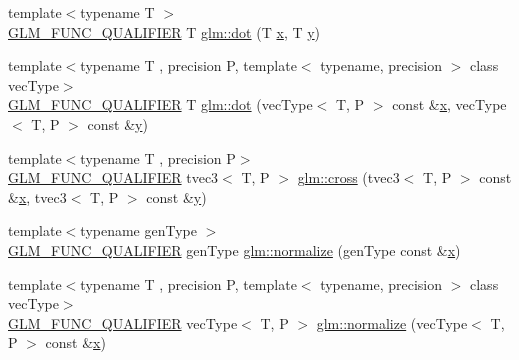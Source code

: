 \begin{DoxyCompactItemize}
{\footnotesize template$<$typename T $>$ }\\\mbox{\hyperlink{setup_8hpp_a33fdea6f91c5f834105f7415e2a64407}{G\+L\+M\+\_\+\+F\+U\+N\+C\+\_\+\+Q\+U\+A\+L\+I\+F\+I\+ER}} T \mbox{\hyperlink{namespaceglm_a40370edb74dec9048258c063b9c091c9}{glm\+::dot}} (T \mbox{\hyperlink{glad_8h_a92d0386e5c19fb81ea88c9f99644ab1d}{x}}, T \mbox{\hyperlink{glad_8h_a66ddd433d2cacfe27f5906b7e86faeed}{y}})
\item 
{\footnotesize template$<$typename T , precision P, template$<$ typename, precision $>$ class vec\+Type$>$ }\\\mbox{\hyperlink{setup_8hpp_a33fdea6f91c5f834105f7415e2a64407}{G\+L\+M\+\_\+\+F\+U\+N\+C\+\_\+\+Q\+U\+A\+L\+I\+F\+I\+ER}} T \mbox{\hyperlink{group__core__func__geometric_ga7dada304da2ba7dd3376ab4f178c3f6b}{glm\+::dot}} (vec\+Type$<$ T, P $>$ const \&\mbox{\hyperlink{glad_8h_a92d0386e5c19fb81ea88c9f99644ab1d}{x}}, vec\+Type$<$ T, P $>$ const \&\mbox{\hyperlink{glad_8h_a66ddd433d2cacfe27f5906b7e86faeed}{y}})
\item 
{\footnotesize template$<$typename T , precision P$>$ }\\\mbox{\hyperlink{setup_8hpp_a33fdea6f91c5f834105f7415e2a64407}{G\+L\+M\+\_\+\+F\+U\+N\+C\+\_\+\+Q\+U\+A\+L\+I\+F\+I\+ER}} tvec3$<$ T, P $>$ \mbox{\hyperlink{group__core__func__geometric_gafe2cae8cb26fd44be62aee97369d0af8}{glm\+::cross}} (tvec3$<$ T, P $>$ const \&\mbox{\hyperlink{glad_8h_a92d0386e5c19fb81ea88c9f99644ab1d}{x}}, tvec3$<$ T, P $>$ const \&\mbox{\hyperlink{glad_8h_a66ddd433d2cacfe27f5906b7e86faeed}{y}})
\item 
{\footnotesize template$<$typename gen\+Type $>$ }\\\mbox{\hyperlink{setup_8hpp_a33fdea6f91c5f834105f7415e2a64407}{G\+L\+M\+\_\+\+F\+U\+N\+C\+\_\+\+Q\+U\+A\+L\+I\+F\+I\+ER}} gen\+Type \mbox{\hyperlink{namespaceglm_a213a489b64d438c533ea56f4cb2d2426}{glm\+::normalize}} (gen\+Type const \&\mbox{\hyperlink{glad_8h_a92d0386e5c19fb81ea88c9f99644ab1d}{x}})
\item 
{\footnotesize template$<$typename T , precision P, template$<$ typename, precision $>$ class vec\+Type$>$ }\\\mbox{\hyperlink{setup_8hpp_a33fdea6f91c5f834105f7415e2a64407}{G\+L\+M\+\_\+\+F\+U\+N\+C\+\_\+\+Q\+U\+A\+L\+I\+F\+I\+ER}} vec\+Type$<$ T, P $>$ \mbox{\hyperlink{group__core__func__geometric_gada9451ec170a36fe53552812b9c03a68}{glm\+::normalize}} (vec\+Type$<$ T, P $>$ const \&\mbox{\hyperlink{glad_8h_a92d0386e5c19fb81ea88c9f99644ab1d}{x}})
\item 

\end{DoxyCompactItemize}
